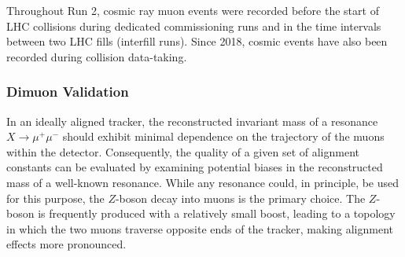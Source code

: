 Throughout Run 2, cosmic ray muon events were recorded before the start of LHC collisions during dedicated commissioning runs and in the time intervals between two LHC fills (interfill runs). Since 2018, cosmic events have also been recorded during collision data-taking.




\subsubsection{Dimuon Validation}

In an ideally aligned tracker, the reconstructed invariant mass of a resonance \( X \to \mu^+\mu^- \) should exhibit minimal dependence on the trajectory of the muons within the detector. Consequently, the quality of a given set of alignment constants can be evaluated by examining potential biases in the reconstructed mass of a well-known resonance. While any resonance could, in principle, be used for this purpose, the \( Z \)-boson decay into muons is the primary choice. The \( Z \)-boson is frequently produced with a relatively small boost, leading to a topology in which the two muons traverse opposite ends of the tracker, making alignment effects more pronounced.

